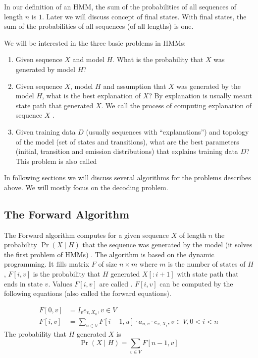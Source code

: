 \begin{note}
In our  definition of an HMM, the sum of the probabilities of all sequences of
length $n$ is $1$. Later we will discuss concept of final states. With final
states, the sum of the probabilities of all sequences (of all lengths) is one.

\end{note}

We will be interested in the three basic problems in HMMs:
\begin{enumerate}[itemsep=-1mm]
\item Given sequence $X$ and model $H$. What is the probability that $X$ was
generated by model $H$?
\item Given sequence $X$, model $H$ and assumption that $X$ was generated by the
model
$H$, what is the best explanation of $X$? By explanation is usually meant state
path that generated $X$. We call the process of computing explanation of
sequence $X$ .
\item Given training data $D$ (usually sequences with ``explanations'') and
topology of the model (set of states and transitions), what are the best parameters
(initial, transition and emission distributions) that explains training
data $D$? This problem is also called 
\end{enumerate} 
In following sections we will discuss several algorithms
for the problems describes above. We will mostly focus on the
decoding problem.


\subsection{The Forward Algorithm}
The Forward algorithm computes for a given sequence $X$ of
length $n$ the probability $\Pr\left(X\mid H\right)$ that the sequence was
generated by the model (it solves the first problem of HMMs) \cite{Durbin1998}. The algorithm is
based on the dynamic programming. It fills
matrix $F$ of size $n\times m$ where $m$ is the number of states of $H$, $F[i,v]$ is the probability that $H$
generated $X[:i+1]$ with state path that ends in state $v$. Values $F[i,v]$ are  called . $F[i,v]$ can be computed by the following equations (also called the
forward equations).

\begin{align}
F[0,v] &= I_ve_{v,X_0}, v\in V\\
F[i,v] &= \sum_{u\in V}F[i-1,u] \cdot a_{u,v} \cdot e_{v,X_i}, v\in V,0< i < n
\end{align}
The probability that $H$ generated $X$ is 
 \[\Pr\left(X\mid H\right) = \sum_{v\in V} F[n-1,v]\]

